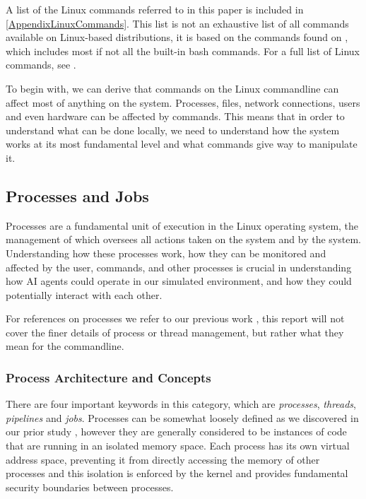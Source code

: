 A list of the Linux commands referred to in this paper is included in \autoref{AppendixLinuxCommands}. This list is not an exhaustive list of all commands available on Linux-based distributions, it is based on the commands found on \textcite{CommandLineReference}, which includes most if not all the built-in bash commands. For a full list of Linux commands, see \textcite{LinuxManPages}. 

To begin with, we can derive that commands on the Linux commandline can affect most of anything on the system. Processes, files, network connections, users and even hardware can be affected by commands. This means that in order to understand what can be done locally, we need to understand how the system works at its most fundamental level and what commands give way to manipulate it.

\subsection{Processes and Jobs}
\label{ProcessesAndJobs}

Processes are a fundamental unit of execution in the Linux operating system, the management of which oversees all actions taken on the system and by the system. Understanding how these processes work, how they can be monitored and affected by the user, commands, and other processes is crucial in understanding how AI agents could operate in our simulated environment, and how they could potentially interact with each other.

For references on processes we refer to our previous work  \parencite{AsyncSync}, this report will not cover the finer details of process or thread management, but rather what they mean for the commandline.

\subsubsection{Process Architecture and Concepts}
\label{ProcessArchitecture}

There are four important keywords in this category, which are \textit{processes}, \textit{threads}, \textit{pipelines} and \textit{jobs}. Processes can be somewhat loosely defined as we discovered in our prior study \parencite{AsyncSync}, however they are generally considered to be instances of code that are running in an isolated memory space. Each process has its own virtual address space, preventing it from directly accessing the memory of other processes and this isolation is enforced by the kernel and provides fundamental security boundaries between processes.

